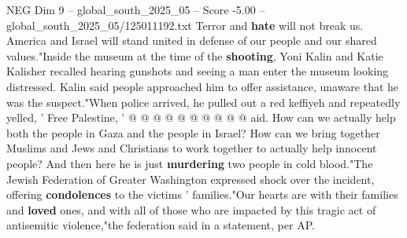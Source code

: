 \begin{textsample}{NEG Dim 9 – global\_south\_2025\_05 – Score -5.00 – global\_south\_2025\_05/125011192.txt}
Terror and \textbf{hate} will not break us.
America and Israel will stand united in defense of our people and our shared values."Inside the museum at the time of the \textbf{shooting}, Yoni Kalin and Katie Kalisher recalled hearing gunshots and seeing a man enter the museum looking distressed.
Kalin said people approached him to offer assistance, unaware that he was the suspect."When police arrived, he pulled out a red keffiyeh and repeatedly yelled, ' Free Palestine, ' @ @ @ @ @ @ @ @ @ @ aid.
How can we actually help both the people in Gaza and the people in Israel?
How can we bring together Muslims and Jews and Christians to work together to actually help innocent people?
And then here he is just \textbf{murdering} two people in cold blood."The Jewish Federation of Greater Washington expressed shock over the incident, offering \textbf{condolences} to the victims ' families."Our hearts are with their families and \textbf{loved} ones, and with all of those who are impacted by this tragic act of antisemitic violence,"the federation said in a statement, per AP.

\end{textsample}
